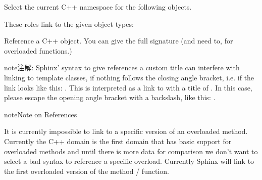\documentclass[letterpaper,10pt,english]{sphinxmanual}
\begin{document}
\begin{fulllineitems}
\begin{quote}

\begin{fulllineitems}
\label{domains:_CPPv2N8theclass14const_iteratorE}
\end{fulllineitems}

\end{quote}

\end{fulllineitems}


\begin{fulllineitems}
\label{domains:directive-cpp:namespace}
Select the current C++ namespace for the following objects.

\end{fulllineitems}

\label{domains:cpp-roles}
These roles link to the given object types:

\begin{fulllineitems}
\label{domains:role-cpp:class}\label{domains:role-cpp:func}\label{domains:role-cpp:member}\label{domains:role-cpp:type}
Reference a C++ object.  You can give the full signature (and need to, for
overloaded functions.)

\begin{notice}{note}{注解:}
Sphinx' syntax to give references a custom title can interfere with
linking to template classes, if nothing follows the closing angle
bracket, i.e. if the link looks like this: .
This is interpreted as a link to  with a title of .
In this case, please escape the opening angle bracket with a backslash,
like this: .
\end{notice}

\end{fulllineitems}


\begin{notice}{note}{Note on References}

It is currently impossible to link to a specific version of an
overloaded method.  Currently the C++ domain is the first domain
that has basic support for overloaded methods and until there is more
data for comparison we don't want to select a bad syntax to reference a
specific overload.  Currently Sphinx will link to the first overloaded
version of the method / function.
\end{notice}
\end{document}
